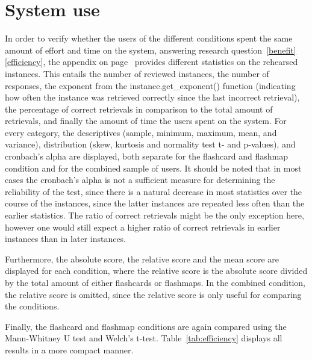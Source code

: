 \section{System use}

In order to verify whether the users of the different conditions spent the same amount of effort and time on the system, answering research question~\ref{benefit}\ref{efficiency}, the  appendix on page~\pageref{app:instance_stats} provides different statistics on the rehearsed instances. This entails the number of reviewed instances, the number of responses, the exponent from the instance.get\_exponent() function (indicating how often the instance was retrieved correctly since the last incorrect retrieval), the percentage of correct retrievals in comparison to the total amount of retrievals, and finally the amount of time the users spent on the system. For every category, the descriptives (sample, minimum, maximum, mean, and variance), distribution (skew, kurtosis and normality test t- and p-values), and cronbach's alpha are displayed, both separate for the flashcard and flashmap condition and for the combined sample of users. It should be noted that in most cases the cronbach's alpha is not a sufficient measure for determining the reliability of the test, since there is a natural decrease in most statistics over the course of the instances, since the latter instances are repeated less often than the earlier statistics. The ratio of correct retrievals might be the only exception here, however one would still expect a higher ratio of correct retrievals in earlier instances than in later instances. 

Furthermore, the absolute score, the relative score and the mean score are displayed for each condition, where the relative score is the absolute score divided by the total amount of either flashcards or flashmaps. In the combined condition, the relative score is omitted, since the relative score is only useful for comparing the conditions. 

Finally, the flashcard and flashmap conditions are again compared using the Mann-Whitney U test and Welch's t-test. Table~\ref{tab:efficiency} displays all results in a more compact manner.

